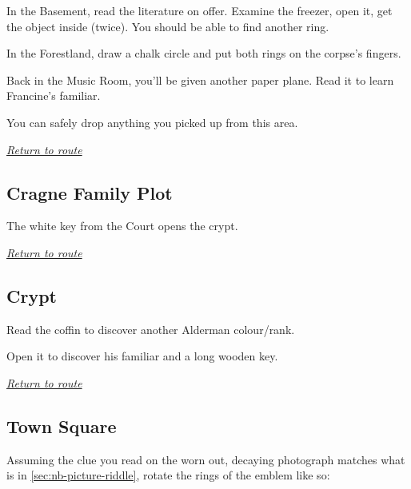 \documentclass[a5paper]{extarticle}
\begin{document}
In the Basement, read the literature on offer.
Examine the freezer, open it, get the object inside (twice).
You should be able to find another ring.

In the Forestland, draw a chalk circle and put both rings on the corpse's fingers.

Back in the Music Room, you'll be given another paper plane.
Read it to learn Francine's familiar.

You can safely drop anything you picked up from this area.

\hyperref[sec:route-6]{\emph{Return to route}}

\newpage
\subsection{Cragne Family Plot}\label{sec:sol-Cragne-Family-Plot-1}

The white key from the Court opens the crypt.

\hyperref[sec:route-6]{\emph{Return to route}}

\newpage
\subsection{Crypt}\label{sec:sol-Crypt}

Read the coffin to discover another Alderman colour/rank.

Open it to discover his familiar and a long wooden key.

\hyperref[sec:route-6]{\emph{Return to route}}

\newpage
\subsection{Town Square}\label{sec:sol-Town-Square}

Assuming the clue you read on the worn out, decaying photograph matches what
is in \cref{sec:nb-picture-riddle}, rotate the rings of the emblem like so:
\end{document}
